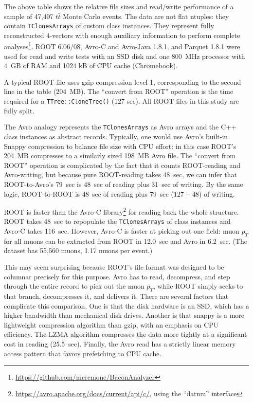 \documentclass{article}
\begin{document}
\vspace{0.3 cm}
The above table shows the relative file sizes and read/write performance of a sample of 47,407 $t\bar{t}$ Monte Carlo events. The data are not flat ntuples: they contain {\tt TClonesArrays} of custom class instances. They represent fully reconstructed 4-vectors with enough auxiliary information to perform complete analyses\footnote{\url{https://github.com/mcremone/BaconAnalyzer}}. ROOT 6.06/08, Avro-C and Avro-Java 1.8.1, and Parquet 1.8.1 were used for read and write tests with an SSD disk and one 800~MHz processor with 4~GB of RAM and 1024 kB of CPU cache (Chromebook).

A typical ROOT file uses gzip compression level 1, corresponding to the second line in the table (204~MB). The ``convert from ROOT'' operation is the time required for a {\tt TTree::CloneTree()} (127 sec). All ROOT files in this study are fully split.

The Avro analogy represents the {\tt TClonesArrays} as Avro arrays and the C++ class instances as abstract records. Typically, one would use Avro's built-in Snappy compression to balance file size with CPU effort: in this case ROOT's 204~MB compresses to a similarly sized 198~MB Avro file. The ``convert from ROOT'' operation is complicated by the fact that it counts ROOT-reading and Avro-writing, but because pure ROOT-reading takes 48~sec, we can infer that ROOT-to-Avro's 79~sec is 48~sec of reading plus 31~sec of writing. By the same logic, ROOT-to-ROOT is 48~sec of reading plus 79~sec ($127 - 48$) of writing.

ROOT is faster than the Avro-C library\footnote{\url{https://avro.apache.org/docs/current/api/c/}, using the ``datum'' interface} for reading back the whole structure. ROOT takes 48~sec to repopulate the {\tt TClonesArrays} of class instances and Avro-C takes 116~sec. However, Avro-C is faster at picking out one field: muon $p_T$ for all muons can be extracted from ROOT in 12.0~sec and Avro in 6.2~sec. (The dataset has 55,560 muons, 1.17 muons per event.)

This may seem surprising because ROOT's file format was designed to be columnar precisely for this purpose. Avro has to read, decompress, and step through the entire record to pick out the muon $p_T$, while ROOT simply seeks to that branch, decompresses it, and delivers it. There are several factors that complicate this comparison. One is that the disk hardware is an SSD, which has a higher bandwidth than mechanical disk drives. Another is that snappy is a more lightweight compression algorithm than gzip, with an emphasis on CPU efficiency. The LZMA algorithm compresses the data more tightly at a significant cost in reading (25.5~sec). Finally, the Avro read has a strictly linear memory access pattern that favors prefetching to CPU cache.
\end{document}
